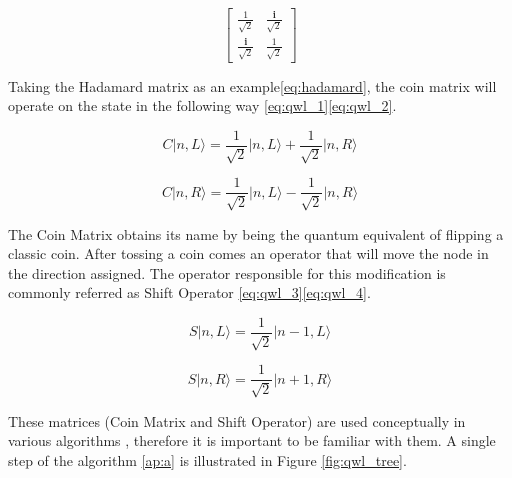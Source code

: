 \begin{equation}
\label{eq:qwl_symmetric}
\left[\begin{array}{cc}
\frac{1}{\sqrt{2}} & \frac{\mathbf{i}}{\sqrt{2}}\\
\frac{\mathbf{i}}{\sqrt{2}} & \frac{1}{\sqrt{2}}
\end{array}\right]
\end{equation}

Taking the Hadamard matrix as an example\eqref{eq:hadamard}, the coin matrix will operate on the state in the following way \eqref{eq:qwl_1}\eqref{eq:qwl_2}\cite{Ambainis}.

\begin{equation}
\label{eq:qwl_1}
C\vert n, L\rangle = \frac{1}{\sqrt{2}} \vert n, L\rangle + \frac{1}{\sqrt{2}} \vert n, R\rangle
\end{equation}
  
\begin{equation}
\label{eq:qwl_2}
C\vert n, R\rangle = \frac{1}{\sqrt{2}} \vert n, L\rangle - \frac{1}{\sqrt{2}} \vert n, R\rangle
\end{equation} 

The Coin Matrix obtains its name by being the quantum equivalent of flipping a classic coin. After tossing a coin comes an operator that will move the node in the direction assigned. The operator responsible for this modification is commonly referred as Shift Operator \eqref{eq:qwl_3}\eqref{eq:qwl_4}. 

\begin{equation}
\label{eq:qwl_3}
S\vert n, L\rangle = \frac{1}{\sqrt{2}} \vert n-1, L\rangle
\end{equation}

\begin{equation}
\label{eq:qwl_4}
S\vert n, R\rangle = \frac{1}{\sqrt{2}} \vert n+1, R\rangle
\end{equation} 

These matrices (Coin Matrix and Shift Operator) are used conceptually in various algorithms \cite{Rieffel2011}, therefore it is important to be familiar with them. A single step of the algorithm \ref{ap:a} is illustrated in Figure \ref{fig:qwl_tree}.

